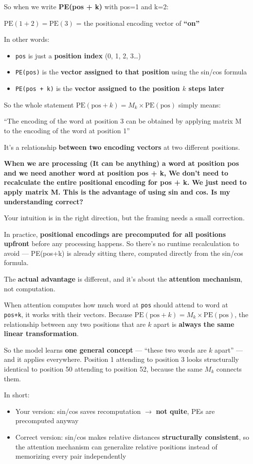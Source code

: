 So when we write \textbf{PE(pos + k)} with pos=1 and k=2:

\medskip
$\text{PE}(1 + 2) = \text{PE}(3)$ = the positional encoding vector of \textbf{``on''}
\medskip

In other words:
\begin{itemize}
  \item \texttt{pos} is just a \textbf{position index} (0, 1, 2, 3\ldots)
  \item \texttt{PE(pos)} is the \textbf{vector assigned to that position} using the sin/cos formula
  \item \texttt{PE(pos + k)} is the \textbf{vector assigned to the position $k$ steps later}
\end{itemize}

So the whole statement $\text{PE}(\text{pos} + k) = M_k \times \text{PE}(\text{pos})$ simply means:

\medskip
``The encoding of the word at position 3 can be obtained by applying matrix M to the encoding of the word at position 1''
\medskip

It's a relationship \textbf{between two encoding vectors} at two different positions.

\bigskip

\textbf{When we are processing (It can be anything) a word at position pos and we need another word at position pos + k, We don't need to recalculate the entire positional encoding for pos + k. We just need to apply matrix M. This is the advantage of using sin and cos. Is my understanding correct?}

Your intuition is in the right direction, but the framing needs a small correction.

In practice, \textbf{positional encodings are precomputed for all positions upfront} before any processing happens. So there's no runtime recalculation to avoid --- PE(pos+k) is already sitting there, computed directly from the sin/cos formula.

\medskip
The \textbf{actual advantage} is different, and it's about the \textbf{attention mechanism}, not computation.

When attention computes how much word at \texttt{pos} should attend to word at \texttt{pos+k}, it works with their vectors. Because $\text{PE}(\text{pos}+k) = M_k \times \text{PE}(\text{pos})$, the relationship between any two positions that are $k$ apart is \textbf{always the same linear transformation}.

So the model learns \textbf{one general concept} --- ``these two words are $k$ apart'' --- and it applies everywhere. Position 1 attending to position 3 looks structurally identical to position 50 attending to position 52, because the same $M_k$ connects them.

\medskip
In short:
\begin{itemize}
  \item Your version: sin/cos saves recomputation $\rightarrow$ \textbf{not quite}, PEs are precomputed anyway
  \item Correct version: sin/cos makes relative distances \textbf{structurally consistent}, so the attention mechanism can generalize relative positions instead of memorizing every pair independently
\end{itemize}
